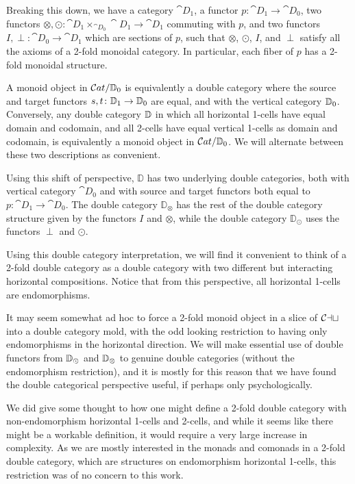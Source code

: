 Breaking this down, we have a category $\cat{D}_1$, a functor $p\colon\cat{D}_1\to\cat{D}_0$, two functors $\otimes, \odot\colon \cat{D}_1\times_{\cat{D}_0}\cat{D}_1\to\cat{D}_1$ commuting with $p$, and two functors $I,\perp\colon\cat{D}_0\to\cat{D}_1$ which are sections of $p$, such that $\otimes$, $\odot$, $I$, and $\perp$ satisfy all the axioms of a 2-fold monoidal category. In particular, each fiber of $p$ has a 2-fold monoidal structure.

A monoid object in $\mathcal{C}at/\mathbb{D}_0$ is equivalently a double category where the source and target functors $s,t\colon \mathbb{D}_1\to \mathbb{D}_0$ are equal, and with the vertical category $\mathbb{D}_0$. Conversely, any double category $\mathbb{D}$ in which all horizontal 1-cells have equal domain and codomain, and all 2-cells have equal vertical 1-cells as domain and codomain, is equivalently a monoid object in $\mathcal{C}at/\mathbb{D}_0$. We will alternate between these two descriptions as convenient.

Using this shift of perspective, $\mathbb{D}$ has two underlying double categories, both with vertical category $\cat{D}_0$ and with source and target functors both equal to $p\colon\cat{D}_1\to\cat{D}_0$. The double category $\mathbb{D}_{\otimes}$ has the rest of the double category structure given by the functors $I$ and $\otimes$, while the double category $\mathbb{D}_{\odot}$ uses the functors $\perp$ and $\odot$.

Using this double category interpretation, we will find it convenient to think of a 2-fold double category as a double category with two different but interacting horizontal compositions. Notice that from this perspective, all horizontal 1-cells are endomorphisms.

\begin{remark}
	It may seem somewhat ad hoc to force a 2-fold monoid object in a slice of $\mathcal{Cat}$ into a double category mold, with the odd looking restriction to having only endomorphisms in the horizontal direction. We will make essential use of double functors from $\mathbb{D}_{\odot}$ and $\mathbb{D}_{\otimes}$ to genuine double categories (without the endomorphism restriction), and it is mostly for this reason that we have found the double categorical perspective useful, if perhaps only psychologically.

	We did give some thought to how one might define a 2-fold double category with non-endomorphism horizontal 1-cells and 2-cells, and while it seems like there might be a workable definition, it would require a very large increase in complexity. As we are mostly interested in the monads and comonads in a 2-fold double category, which are structures on endomorphism horizontal 1-cells, this restriction was of no concern to this work.
\end{remark}

